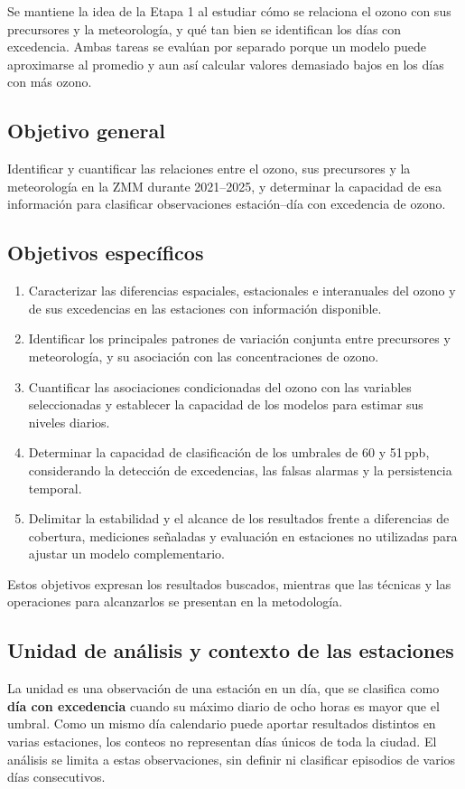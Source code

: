 \documentclass[11pt,letterpaper]{article}
\newcommand{\ppb}{\,ppb}
\begin{document}
Se mantiene la idea de la Etapa 1 al estudiar cómo se relaciona el ozono con sus precursores y la meteorología, y qué tan bien se identifican los días con excedencia. Ambas tareas se evalúan por separado porque un modelo puede aproximarse al promedio y aun así calcular valores demasiado bajos en los días con más ozono.

\subsection{Objetivo general}
Identificar y cuantificar las relaciones entre el ozono, sus precursores y la meteorología en la ZMM durante 2021--2025, y determinar la capacidad de esa información para clasificar observaciones estación--día con excedencia de ozono.

\subsection{Objetivos específicos}
\begin{enumerate}
\setlength{\itemsep}{2pt}
\item Caracterizar las diferencias espaciales, estacionales e interanuales del ozono y de sus excedencias en las estaciones con información disponible.
\item Identificar los principales patrones de variación conjunta entre precursores y meteorología, y su asociación con las concentraciones de ozono.
\item Cuantificar las asociaciones condicionadas del ozono con las variables seleccionadas y establecer la capacidad de los modelos para estimar sus niveles diarios.
\item Determinar la capacidad de clasificación de los umbrales de 60 y 51\ppb, considerando la detección de excedencias, las falsas alarmas y la persistencia temporal.
\item Delimitar la estabilidad y el alcance de los resultados frente a diferencias de cobertura, mediciones señaladas y evaluación en estaciones no utilizadas para ajustar un modelo complementario.
\end{enumerate}
Estos objetivos expresan los resultados buscados, mientras que las técnicas y las operaciones para alcanzarlos se presentan en la metodología.

\subsection{Unidad de análisis y contexto de las estaciones}
La unidad es una observación de una estación en un día, que se clasifica como \textbf{día con excedencia} cuando su máximo diario de ocho horas es mayor que el umbral. Como un mismo día calendario puede aportar resultados distintos en varias estaciones, los conteos no representan días únicos de toda la ciudad. El análisis se limita a estas observaciones, sin definir ni clasificar episodios de varios días consecutivos.
\end{document}
